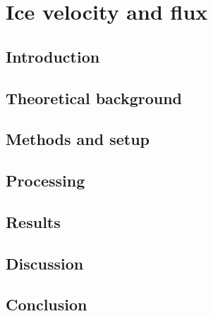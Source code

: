 

\renewcommand{\chapterauthor}{Julien, Linda Thielke, Moritz Bitterling}
\chapter{Ice velocity and flux}
\label{icevel}

\begin{abstract}

\end{abstract}


\section{Introduction}


\section{Theoretical background}


\section{Methods and setup}


\section{Processing}


\section{Results}


\section{Discussion}


\section{Conclusion}




